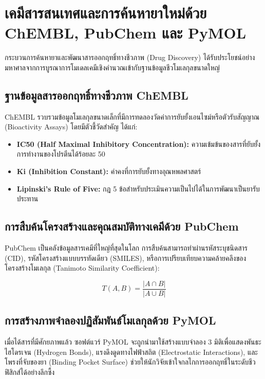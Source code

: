 \chapter{เคมีสารสนเทศและการค้นหายาใหม่ด้วย ChEMBL, PubChem และ PyMOL}

กระบวนการค้นหายาและพัฒนาสารออกฤทธิ์ทางชีวภาพ (Drug Discovery) ได้รับประโยชน์อย่างมหาศาลจากการบูรณาการโมเดลเคมีเชิงคำนวณเข้ากับฐานข้อมูลชีวโมเลกุลขนาดใหญ่

\section{ฐานข้อมูลสารออกฤทธิ์ทางชีวภาพ ChEMBL}

ChEMBL รวบรวมข้อมูลโมเลกุลขนาดเล็กที่มีการทดลองวัดค่าการยับยั้งเอนไซม์หรือตัวรับสัญญาณ (Bioactivity Assays) โดยมีตัวชี้วัดสำคัญ ได้แก่:
\begin{itemize}
    \item \textbf{IC50 (Half Maximal Inhibitory Concentration):} ความเข้มข้นของสารที่ยับยั้งการทำงานของโปรตีนได้ร้อยละ 50
    \item \textbf{Ki (Inhibition Constant):} ค่าคงที่การยับยั้งทางอุณหพลศาสตร์
    \item \textbf{Lipinski's Rule of Five:} กฎ 5 ข้อสำหรับประเมินความเป็นไปได้ในการพัฒนาเป็นยารับประทาน
\end{itemize}

\section{การสืบค้นโครงสร้างและคุณสมบัติทางเคมีด้วย PubChem}

PubChem เป็นคลังข้อมูลสารเคมีที่ใหญ่ที่สุดในโลก การสืบค้นสามารถทำผ่านรหัสระบุชนิดสาร (CID), รหัสโครงสร้างแบบบรรทัดเดียว (SMILES), หรือการเปรียบเทียบความคล้ายคลึงของโครงสร้างโมเลกุล (Tanimoto Similarity Coefficient):

\begin{equation}
T(A, B) = \frac{|A \cap B|}{|A \cup B|}
\end{equation}

\section{การสร้างภาพจำลองปฏิสัมพันธ์โมเลกุลด้วย PyMOL}

เมื่อได้สารที่มีศักยภาพแล้ว ซอฟต์แวร์ PyMOL จะถูกนำมาใช้สร้างแบบจำลอง 3 มิติเพื่อแสดงพันธะไฮโดรเจน (Hydrogen Bonds), แรงดึงดูดทางไฟฟ้าสถิต (Electrostatic Interactions), และโพรงที่จับของยา (Binding Pocket Surface) ช่วยให้นักวิจัยเข้าใจกลไกการออกฤทธิ์ในระดับชีวฟิสิกส์ได้อย่างลึกซึ้ง
